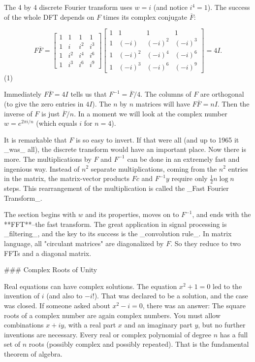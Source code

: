 The 4 by 4 discrete Fourier transform uses \(w=i\) (and notice \(i^{4}=1\)). The success of the whole DFT depends on \(F\) times its complex conjugate \(\overline{F}\):

\[F\overline{F}=\begin{bmatrix}1&1&1&1\\ 1&i&i^{2}&i^{3}\\ 1&i^{2}&i^{4}&i^{6}\\ 1&i^{3}&i^{6}&i^{9}\end{bmatrix}\begin{bmatrix}1&1&1&1\\ 1&(-i)&(-i)^{2}&(-i)^{3}\\ 1&(-i)^{2}&(-i)^{4}&(-i)^{6}\\ 1&(-i)^{3}&(-i)^{6}&(-i)^{9}\end{bmatrix}=4I.\] (1)

Immediately \(F\overline{F}=4I\) tells us that \(F^{-1}=\overline{F}/4\). The columns of \(F\) are orthogonal (to give the zero entries in \(4I\)). The \(n\) by \(n\) matrices will have \(F\overline{F}=nI\). Then the inverse of \(F\) is just \(\overline{F}/n\). In a moment we will look at the complex number \(w=e^{2\pi i/n}\) (which equals \(i\) for \(n=4\)).

It is remarkable that \(F\) is so easy to invert. If that were all (and up to 1965 it _was_ all), the discrete transform would have an important place. Now there is more. The multiplications by \(F\) and \(F^{-1}\) can be done in an extremely fast and ingenious way. Instead of \(n^{2}\) separate multiplications, coming from the \(n^{2}\) entries in the matrix, the matrix-vector products \(Fc\) and \(F^{-1}y\) require only \(\frac{1}{2}n\log n\) steps. This rearrangement of the multiplication is called the _Fast Fourier Transform_.

The section begins with \(w\) and its properties, moves on to \(F^{-1}\), and ends with the **FFT**--the fast transform. The great application in signal processing is _filtering_, and the key to its success is the _convolution rule_. In matrix language, all "circulant matrices" are diagonalized by \(F\). So they reduce to two FFTs and a diagonal matrix.

### Complex Roots of Unity

Real equations can have complex solutions. The equation \(x^{2}+1=0\) led to the invention of \(i\) (and also to \(-i!\)). That was declared to be a solution, and the case was closed. If someone asked about \(x^{2}-i=0\), there was an answer: The square roots of a complex number are again complex numbers. You must allow combinations \(x+iy\), with a real part \(x\) and an imaginary part \(y\), but no further inventions are necessary. Every real or complex polynomial of degree \(n\) has a full set of \(n\) roots (possibly complex and possibly repeated). That is the fundamental theorem of algebra.

